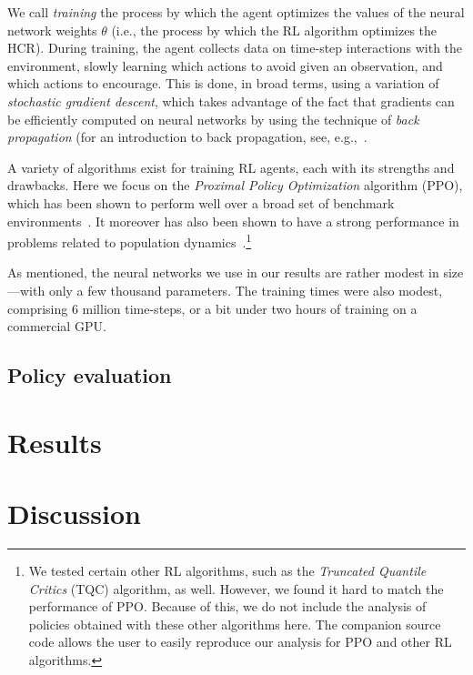 \documentclass[floatfix,nofootinbib,longbibliography,notitlepage]{revtex4-1}
\begin{document}
We call \emph{training} the process by which the agent optimizes the values of the neural network weights $\theta$ (i.e., the process by which the RL algorithm optimizes the HCR). 
During training, the agent collects data on time-step interactions with the environment, slowly learning which actions to avoid given an observation, and which actions to encourage. 
This is done, in broad terms, using a variation of \emph{stochastic gradient descent}, which takes advantage of the fact that gradients can be efficiently computed on neural networks by using the technique of \emph{back propagation} (for an introduction to back propagation, see, e.g.,~\cite[Chapter~7]{rojas1996}.

A variety of algorithms exist for training RL agents, each with its strengths and drawbacks.
 Here we focus on the \emph{Proximal Policy Optimization} algorithm (PPO), which has been shown to perform well over a broad set of benchmark environments~\cite{schulman-ppo}. 
 It moreover has also been shown to have a strong performance in problems related to population dynamics~\cite{lapeyrolerie-rl,prettydarngood}.\footnote{
 We tested certain other RL algorithms, such as the \emph{Truncated Quantile Critics} (TQC) algorithm, as well. 
 However, we found it hard to match the performance of PPO. 
 Because of this, we do not include the analysis of policies obtained with these other algorithms here. 
 The companion source code allows the user to easily reproduce our analysis for PPO and other RL algorithms.
 }

 As mentioned, the neural networks we use in our results are rather modest in size—with only a few thousand parameters. 
 The training times were also modest, comprising 6 million time-steps, or a bit under two hours of training on a commercial GPU.


\subsection{Policy evaluation}


%
%
%
\section{Results}


%
%
%
\section{Discussion}




 

\end{document}
